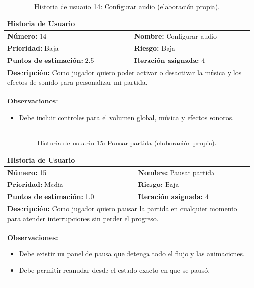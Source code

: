 \begin{table}[H]
\centering
\caption{Historia de usuario 14: Configurar audio (elaboración propia).\label{tab:hu14}}
\renewcommand{\arraystretch}{1.5}
\begin{tabular}{|p{}|p{}|}
\hline
\multicolumn{2}{|l|}{\textbf{Historia de Usuario}} \\
\hline
\textbf{Número:} 14 & \textbf{Nombre:} Configurar audio \\
\hline
\textbf{Prioridad:} Baja & \textbf{Riesgo:} Baja \\
\hline
\textbf{Puntos de estimación:} 2.5 & \textbf{Iteración asignada:} 4 \\
\hline
\multicolumn{2}{|p{0.945\textwidth}|}{\textbf{Descripción:} Como jugador quiero poder activar o desactivar la música y los efectos de sonido para personalizar mi partida.} \\
\hline
\multicolumn{2}{|p{0.945\textwidth}|}{\textbf{Observaciones:}
\vspace{-0.5em}
\begin{itemize}
    \setlength\itemsep{0em}
    \item Debe incluir controles para el volumen global, música y efectos sonoros.
\end{itemize}
\vspace{-1em}
} \\
\hline
\end{tabular}
\end{table}

\begin{table}[H]
\centering
\caption{Historia de usuario 15: Pausar partida (elaboración propia).\label{tab:hu15}}
\renewcommand{\arraystretch}{1.5}
\begin{tabular}{|p{}|p{}|}
\hline
\multicolumn{2}{|l|}{\textbf{Historia de Usuario}} \\
\hline
\textbf{Número:} 15 & \textbf{Nombre:} Pausar partida \\
\hline
\textbf{Prioridad:} Media & \textbf{Riesgo:} Baja \\
\hline
\textbf{Puntos de estimación:} 1.0 & \textbf{Iteración asignada:} 4 \\
\hline
\multicolumn{2}{|p{0.945\textwidth}|}{\textbf{Descripción:} Como jugador quiero pausar la partida en cualquier momento para atender interrupciones sin perder el progreso.} \\
\hline
\multicolumn{2}{|p{0.945\textwidth}|}{\textbf{Observaciones:}
\vspace{-0.5em}
\begin{itemize}
    \setlength\itemsep{0em}
    \item Debe existir un panel de pausa que detenga todo el flujo y las animaciones.
    \item Debe permitir reanudar desde el estado exacto en que se pausó.
\end{itemize}
\vspace{-1em}
} \\
\hline
\end{tabular}
\end{table}

